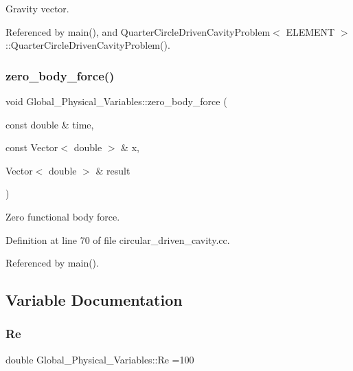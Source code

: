 Gravity vector. 



Referenced by main(), and Quarter\+Circle\+Driven\+Cavity\+Problem$<$ E\+L\+E\+M\+E\+N\+T $>$\+::\+Quarter\+Circle\+Driven\+Cavity\+Problem().

\mbox{\label{namespaceGlobal__Physical__Variables_a9780d615ae07c4e00a436ab2973b54e6}} 
\subsubsection{\texorpdfstring{zero\+\_\+body\+\_\+force()}{zero\_body\_force()}}
{\footnotesize\ttfamily void Global\+\_\+\+Physical\+\_\+\+Variables\+::zero\+\_\+body\+\_\+force (\begin{DoxyParamCaption}\item[{const double \&}]{time,  }\item[{const Vector$<$ double $>$ \&}]{x,  }\item[{Vector$<$ double $>$ \&}]{result }\end{DoxyParamCaption})}



Zero functional body force. 



Definition at line 70 of file circular\+\_\+driven\+\_\+cavity.\+cc.



Referenced by main().



\subsection{Variable Documentation}
\mbox{\label{namespaceGlobal__Physical__Variables_ab814e627d2eb5bc50318879d19ab16b9}} 
\subsubsection{\texorpdfstring{Re}{Re}}
{\footnotesize\ttfamily double Global\+\_\+\+Physical\+\_\+\+Variables\+::\+Re =100}



